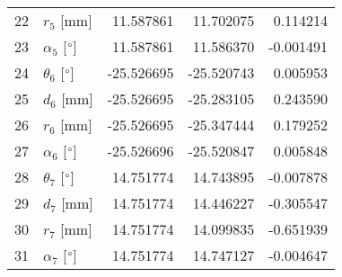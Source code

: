 \documentclass{standalone}%
\begin{document}
\begin{tabular}{llrrr}
22 &              $r_{5}$ [mm] &  11.587861 &  11.702075 &   0.114214 \\
23 &  $\alpha_{5}$ [$\degree$] &  11.587861 &  11.586370 &  -0.001491 \\
24 &  $\theta_{6}$ [$\degree$] & -25.526695 & -25.520743 &   0.005953 \\
25 &              $d_{6}$ [mm] & -25.526695 & -25.283105 &   0.243590 \\
26 &              $r_{6}$ [mm] & -25.526695 & -25.347444 &   0.179252 \\
27 &  $\alpha_{6}$ [$\degree$] & -25.526696 & -25.520847 &   0.005848 \\
28 &  $\theta_{7}$ [$\degree$] &  14.751774 &  14.743895 &  -0.007878 \\
29 &              $d_{7}$ [mm] &  14.751774 &  14.446227 &  -0.305547 \\
30 &              $r_{7}$ [mm] &  14.751774 &  14.099835 &  -0.651939 \\
31 &  $\alpha_{7}$ [$\degree$] &  14.751774 &  14.747127 &  -0.004647 \\
\bottomrule
\end{tabular}
%
\end{document}
